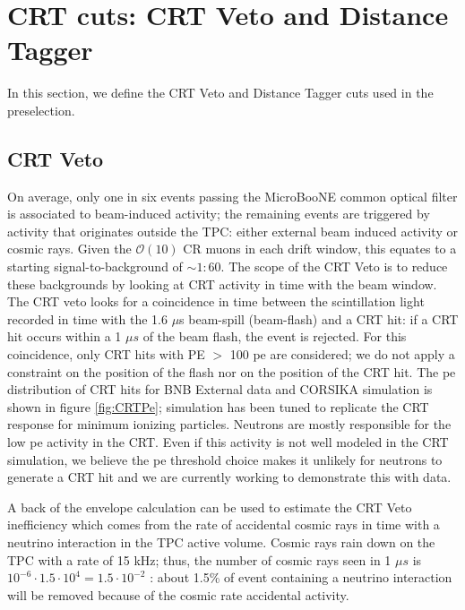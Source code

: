 
\section{CRT cuts: CRT Veto and Distance Tagger}\label{sec:Cuts}
In this section, we define the  CRT Veto and Distance Tagger cuts used in the preselection.
\subsection{CRT Veto}\label{sec:VetoCuts}
On average, only one in six events passing the MicroBooNE common optical filter is associated to beam-induced activity; the remaining events are triggered by activity that originates outside the TPC: either external beam induced activity or cosmic rays. Given the $\mathcal{O}(10)$ CR muons in each drift window, this equates to a starting signal-to-background of $\sim 1 : 60$. The scope of the CRT Veto is to reduce these backgrounds by looking at CRT activity in time with the beam window. 
The CRT veto looks for a coincidence in time between the scintillation light recorded in time with the 1.6 $\mu$s beam-spill (beam-flash) and a CRT hit: if a CRT hit occurs within a 1 $\mu s$ of the beam flash, the event is rejected. For this coincidence, only CRT hits with PE $>$ 100 pe are considered; we do not apply a constraint on the position of the flash nor on the position of the CRT hit. The pe distribution of CRT hits for BNB External data and CORSIKA simulation is shown in figure \ref{fig:CRTPe};  simulation has been tuned to replicate the CRT response for minimum ionizing particles. Neutrons are mostly responsible for the low pe activity in the CRT. Even if this activity is not well modeled in the CRT simulation, we believe the pe threshold choice makes it unlikely for neutrons to generate a CRT hit and we are currently working to demonstrate this with data. 

A back of the envelope calculation can be used to estimate the CRT Veto inefficiency which comes from the rate of accidental cosmic rays in time with a neutrino interaction in the TPC active volume. Cosmic rays rain down on the TPC with a rate of 15 kHz; thus, the number of cosmic rays seen in 1 $\mu s$ is $10^{-6} \cdot 1.5\cdot10^{4} = 1.5 \cdot10^{-2}$ : about 1.5\% of event containing a neutrino interaction will be removed because of the cosmic rate accidental activity. 
 
